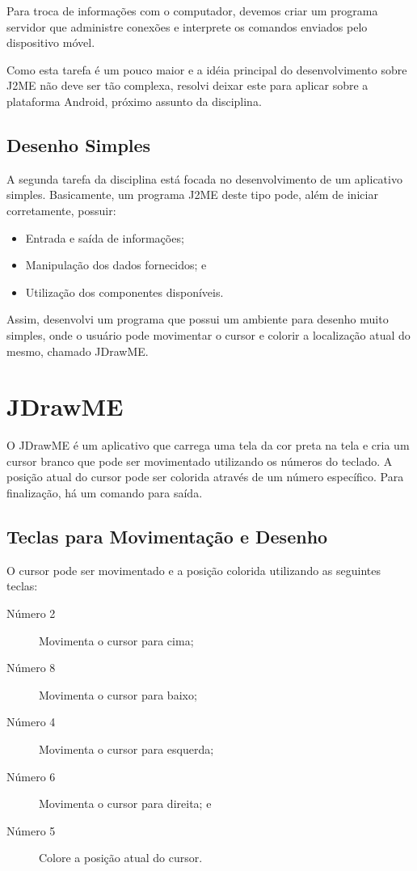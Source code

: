 \documentclass{article}
\begin{document}
Para troca de informações com o computador, devemos criar um programa servidor
que administre conexões e interprete os comandos enviados pelo dispositivo
móvel.

Como esta tarefa é um pouco maior e a idéia principal do desenvolvimento sobre
J2ME não deve ser tão complexa, resolvi deixar este para aplicar sobre a
plataforma Android, próximo assunto da disciplina.

\subsection{Desenho Simples}

A segunda tarefa da disciplina está focada no desenvolvimento de um aplicativo
simples. Basicamente, um programa J2ME deste tipo pode, além de iniciar
corretamente, possuir:

\begin{itemize}
  \item Entrada e saída de informações;
  \item Manipulação dos dados fornecidos; e
  \item Utilização dos componentes disponíveis.
\end{itemize}

Assim, desenvolvi um programa que possui um ambiente para desenho muito simples,
onde o usuário pode movimentar o cursor e colorir a localização atual do mesmo,
chamado JDrawME.

\section{JDrawME}

O JDrawME é um aplicativo que carrega uma tela da cor preta na tela e cria um
cursor branco que pode ser movimentado utilizando os números do teclado. A
posição atual do cursor pode ser colorida através de um número específico. Para
finalização, há um comando para saída.

\subsection{Teclas para Movimentação e Desenho}

O cursor pode ser movimentado e a posição colorida utilizando as seguintes
teclas:

\begin{description}
\item[Número 2] Movimenta o cursor para cima;
\item[Número 8] Movimenta o cursor para baixo;
\item[Número 4] Movimenta o cursor para esquerda;
\item[Número 6] Movimenta o cursor para direita; e
\item[Número 5] Colore a posição atual do cursor.
\end{description}
\end{document}
